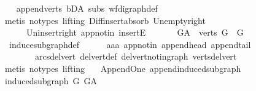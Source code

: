 \begin{isabellebody}
\ \ \isamarkupfalse%
\ append{\isacharunderscore}{\kern0pt}verts\ bD{\isacharunderscore}{\kern0pt}A\ subs\ wf{\isacharunderscore}{\kern0pt}digraph{\isacharunderscore}{\kern0pt}def\isanewline
\ \ \isamarkupfalse%
\ {\isacharparenleft}{\kern0pt}metis\ {\isacharparenleft}{\kern0pt}no{\isacharunderscore}{\kern0pt}types{\isacharcomma}{\kern0pt}\ lifting{\isacharparenright}{\kern0pt}\ Diff{\isacharunderscore}{\kern0pt}insert{\isacharunderscore}{\kern0pt}absorb\ Un{\isacharunderscore}{\kern0pt}empty{\isacharunderscore}{\kern0pt}right\isanewline
\ \ \ \ \ \ Un{\isacharunderscore}{\kern0pt}insert{\isacharunderscore}{\kern0pt}right\ app{\isacharunderscore}{\kern0pt}notin\ insertE{\isacharparenright}{\kern0pt}\ \ \isanewline
\ \ \isamarkupfalse%
\ \ {\isachardoublequoteopen}G{\isacharunderscore}{\kern0pt}A\ {\isasymrestriction}\ verts\ G\ {\isacharequal}{\kern0pt}\ G{\isachardoublequoteclose}\ \isanewline
\ \ \ \ \isamarkupfalse%
\ \ induce{\isacharunderscore}{\kern0pt}subgraph{\isacharunderscore}{\kern0pt}def\isanewline
\ \ \ \ \isamarkupfalse%
\ aaa\ app{\isacharunderscore}{\kern0pt}notin\ append{\isacharunderscore}{\kern0pt}head\ append{\isacharunderscore}{\kern0pt}tail\ \isanewline
\ \ \ \ \ \ \ \ arcs{\isacharunderscore}{\kern0pt}del{\isacharunderscore}{\kern0pt}vert\ del{\isacharunderscore}{\kern0pt}vert{\isacharunderscore}{\kern0pt}def\ del{\isacharunderscore}{\kern0pt}vert{\isacharunderscore}{\kern0pt}not{\isacharunderscore}{\kern0pt}in{\isacharunderscore}{\kern0pt}graph\ verts{\isacharunderscore}{\kern0pt}del{\isacharunderscore}{\kern0pt}vert\isanewline
\ \ \ \ \isamarkupfalse%
\ {\isacharparenleft}{\kern0pt}metis\ {\isacharparenleft}{\kern0pt}no{\isacharunderscore}{\kern0pt}types{\isacharcomma}{\kern0pt}\ lifting{\isacharparenright}{\kern0pt}{\isacharparenright}{\kern0pt}\ \isanewline
{}\isamarkupfalse%
%
\endisatagproof
{\isafoldproof}%
%
\isadelimproof
\isanewline
%
\endisadelimproof
\isanewline
{}\isamarkupfalse%
\ {\isacharparenleft}{\kern0pt}\ Append{\isacharunderscore}{\kern0pt}One{\isacharparenright}{\kern0pt}\ append{\isacharunderscore}{\kern0pt}induced{\isacharunderscore}{\kern0pt}subgraph{\isacharcolon}{\kern0pt}\ \isanewline
\ {\isachardoublequoteopen}induced{\isacharunderscore}{\kern0pt}subgraph\ G\ G{\isacharunderscore}{\kern0pt}A\ {\isachardoublequoteclose}\isanewline
%
\isadelimproof
%
\endisadelimproof
%
\isatagproof
{}\isamarkupfalse%
\ {\isacharminus}{\kern0pt}\isanewline
\ \ \isamarkupfalse%

\end{isabellebody}
